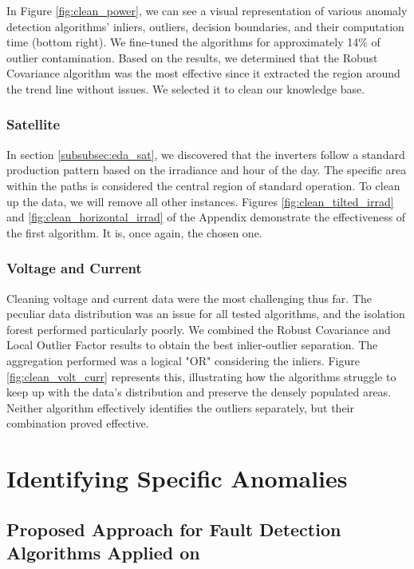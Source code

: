 In Figure \ref{fig:clean_power}, we can see a visual representation of various anomaly detection algorithms' inliers, outliers, decision boundaries, and their computation time (bottom right). We fine-tuned the algorithms for approximately 14\% of outlier contamination. Based on the results, we determined that the Robust Covariance algorithm was the most effective since it extracted the region around the trend line without issues. We selected it to clean our knowledge base.

\subsubsection{Satellite}

In section \ref{subsubsec:eda_sat}, we discovered that the inverters follow a standard production pattern based on the irradiance and hour of the day. The specific area within the paths is considered the central region of standard operation. To clean up the data, we will remove all other instances. Figures \ref{fig:clean_tilted_irrad} and \ref{fig:clean_horizontal_irrad} of the Appendix demonstrate the effectiveness of the first algorithm. It is, once again, the chosen one.

\subsubsection{Voltage and Current}

Cleaning voltage and current data were the most challenging thus far. The peculiar data distribution was an issue for all tested algorithms, and the isolation forest performed particularly poorly. We combined the Robust Covariance and Local Outlier Factor results to obtain the best inlier-outlier separation. The aggregation performed was a logical "OR" considering the inliers. Figure \ref{fig:clean_volt_curr} represents this, illustrating how the algorithms struggle to keep up with the data's distribution and preserve the densely populated areas. Neither algorithm effectively identifies the outliers separately, but their combination proved effective.

\section{Identifying Specific Anomalies} \label{sec:pvplugin}

\subsection{Proposed Approach for Fault Detection Algorithms Applied on }

